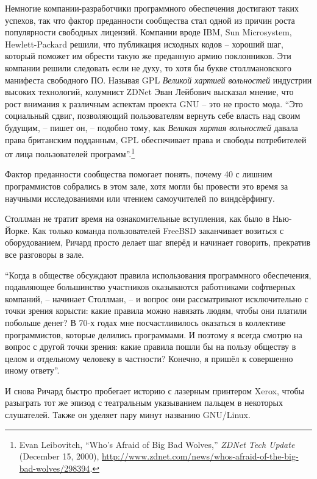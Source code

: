 Немногие компании-разработчики программного обеспечения достигают таких успехов, так что фактор преданности сообщества стал одной из причин роста популярности свободных лицензий. Компании вроде IBM, Sun Microsystem, Hewlett-Packard решили, что публикация исходных кодов -- хороший шаг, который поможет им обрести такую же преданную армию поклонников. Эти компании решили следовать если не духу, то хотя бы букве столлмановского манифеста свободного ПО. Называя GPL \textit{Великой хартией вольностей} индустрии высоких технологий, колумнист ZDNet Эван Лейбович высказал мнение, что рост внимания к различным аспектам проекта GNU -- это не просто мода. \enquote{Это социальный сдвиг, позволяющий пользователям вернуть себе власть над своим будущим, -- пишет он, -- подобно тому, как \textit{Великая хартия вольностей} давала права британским подданным, GPL обеспечивает права и свободы потребителей от лица пользователей программ}.\footnote{Evan Leibovitch, \enquote{Who's Afraid of Big Bad Wolves,} \textit{ZDNet Tech Update} (December 15, 2000), \url{http://www.zdnet.com/news/whos-afraid-of-the-big-bad-wolves/298394}.}

Фактор преданности сообщества помогает понять, почему 40 с лишним программистов собрались в этом зале, хотя могли бы провести это время за научными исследованиями или чтением самоучителей по виндсёрфингу.

Столлман не тратит время на ознакомительные вступления, как было в Нью-Йорке. Как только команда пользователей FreeBSD заканчивает возиться с оборудованием, Ричард просто делает шаг вперёд и начинает говорить, прекратив все разговоры в зале.

\enquote{Когда в обществе обсуждают правила использования программного обеспечения, подавляющее большинство участников оказываются работниками софтверных компаний, -- начинает Столлман, -- и вопрос они рассматривают исключительно с точки зрения корысти: какие правила можно навязать людям, чтобы они платили побольше денег? В 70-х годах мне посчастливилось оказаться в коллективе программистов, которые делились программами. И поэтому я всегда смотрю на вопрос с другой точки зрения: какие правила пошли бы на пользу обществу в целом и отдельному человеку в частности? Конечно, я пришёл к совершенно иному ответу}.

И снова Ричард быстро пробегает историю с лазерным принтером Xerox, чтобы разыграть тот же эпизод с театральным указыванием пальцем в некоторых слушателей. Также он уделяет пару минут названию GNU/Linux.

